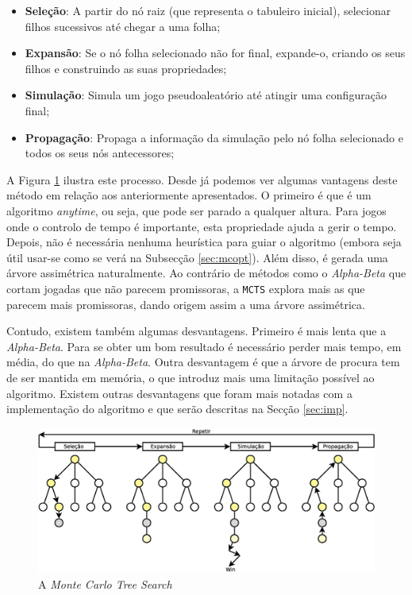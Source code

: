 \documentclass[12pt,a4paper,oneside]{article}
\begin{document}
\begin{itemize}
  \item \textbf{Seleção}: A partir do nó raiz (que representa o
    tabuleiro inicial), selecionar filhos sucessivos até chegar a uma
    folha;
  \item \textbf{Expansão}: Se o nó folha selecionado não for final,
    expande-o, criando os seus filhos e construindo as suas
    propriedades;
  \item \textbf{Simulação}: Simula um jogo pseudoaleatório até atingir
    uma configuração final;
  \item \textbf{Propagação}: Propaga a informação da simulação pelo nó
    folha selecionado e todos os seus nós antecessores;
\end{itemize}

A Figura \ref{fig:mcts} ilustra este processo. Desde já podemos ver
algumas vantagens deste método em relação aos anteriormente
apresentados. O primeiro é que é um algoritmo \textit{anytime}, ou
seja, que pode ser parado a qualquer altura. Para jogos onde o
controlo de tempo é importante, esta propriedade ajuda a gerir o
tempo. Depois, não é necessária nenhuma heurística para guiar o
algoritmo (embora seja útil usar-se como se verá na Subsecção
\ref{sec:mcopt}). Além disso, é gerada uma árvore assimétrica
naturalmente. Ao contrário de métodos como o \textit{Alpha-Beta} que
cortam jogadas que não parecem promissoras, a \texttt{MCTS} explora
mais as que parecem mais promissoras, dando origem assim a uma árvore
assimétrica.

Contudo, existem também algumas desvantagens. Primeiro é mais lenta
que a \textit{Alpha-Beta}. Para se obter um bom resultado é necessário
perder mais tempo, em média, do que na \textit{Alpha-Beta}. Outra
desvantagem é que a árvore de procura tem de ser mantida em memória, o
que introduz mais uma limitação possível ao algoritmo. Existem outras
desvantagens que foram mais notadas com a implementação do algoritmo e
que serão descritas na Secção \ref{sec:imp}.

\begin{figure}[!htb]
  \centering
  \includegraphics[width=1\textwidth]{mcts}
  \caption{A \textit{Monte Carlo Tree Search}}
  \label{fig:mcts}
\end{figure}
\end{document}

